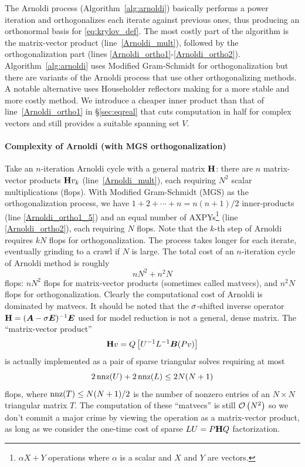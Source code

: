 The Arnoldi process (Algorithm~\ref{alg:arnoldi}) basically performs a power iteration and orthogonalizes each iterate against previous ones, thus producing an orthonormal basis for \eqref{eq:krylov_def}.   The most costly part of the algorithm is the matrix-vector product (line~\ref{Arnoldi_mult}), followed by the orthogonalization part (lines \ref{Arnoldi_ortho1}-\ref{Arnoldi_ortho2}).  
Algorithm~\ref{alg:arnoldi} uses Modified Gram-Schmidt for orthogonalization but there are variants of the Arnoldi process that use other orthogonalizing methods. A notable alternative uses Householder reflectors making for a more stable and more costly method.    We introduce a cheaper inner product than that of line~\ref{Arnoldi_ortho1} in \S\ref{sec:eqreal} that cuts computation in half for complex vectors and still provides a suitable spanning set $V$. 

\paragraph{Complexity of Arnoldi (with MGS orthogonalization)}\label{sec:complexity1}
Take an $n$-iteration Arnoldi cycle with a general matrix $\textbf{\textup{H}}$: there are $n$ matrix-vector products $\textbf{\textup{H}} v_k$ (line~\ref{Arnoldi_mult}),  each requiring $N^2$ scalar multiplications (flops). With Modified Gram-Schmidt (MGS) as the orthogonalization process, we have $1+2+\cdots+n = n(n+1)/2$ inner-products (line \ref{Arnoldi_ortho1_5}) and an equal number of AXPYs\footnote{$\alpha X+Y$ operations where $\alpha$ is a scalar and $X$ and $Y$ are vectors.} (line \ref{Arnoldi_ortho2}), each requiring  $N$ flops.   Note that the $k$-th step of Arnoldi requires $kN$ flops for orthogonalization.  The process takes longer for each iterate, eventually grinding to a crawl if $N$ is large.  The total cost of an $n$-iteration cycle of Arnoldi method is roughly 
\[
n N^2 + n^2 N
\]
flops: 
$n N^2$ flops for matrix-vector products (sometimes called matvecs), and $n^2 N$ flops for  orthogonalization.    Clearly the computational cost of Arnoldi is dominated by matvecs.   It should be noted that the $\sigma$-shifted inverse operator $\textbf{\textup{H}} = (\bm{A} - \sigma \bm{E})^{-1}\bm{E}$ used for model reduction is not a general, dense matrix.   The ``matrix-vector product'' 
\[
\textbf{\textup{H}} v = Q \left[ U^{-1}L^{-1} \bm{B} (Pv) \right] 
\]
is actually implemented as a pair of sparse triangular solves requiring at most 
\[
2\operatorname*{nnz}(U)+2\operatorname*{nnz}(L) \leq 2N(N+1)
\]
 flops, where $\operatorname*{nnz}(T)\leq N(N+1)/2$ is the number of nonzero entries of an $N\times N$ triangular matrix $T$.    The computation of these ``matvecs'' is still $\mathcal{O}\left( N^2 \right)$ so we don't commit a major crime by viewing the operation as a matrix-vector product, as long as we consider the one-time cost of sparse $LU= P \textbf{\textup{H}} Q$ factorization. 

